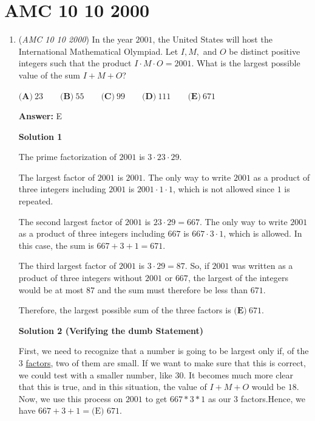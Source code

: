 \section{AMC 10 10 2000}
        \begin{enumerate}
        	\item (\textit{AMC 10 10 2000}) In the year $2001$, the United States will host the International Mathematical Olympiad. Let $I, M,$ and $O$ be distinct positive integers such that the product $I\cdot M \cdot O=2001$. What is the largest possible value of the sum $I+M+O$?


 $\textbf{(A)}\ 23 \qquad\textbf{(B)}\ 55 \qquad\textbf{(C)}\ 99 \qquad\textbf{(D)}\ 111 \qquad\textbf{(E)}\ 671$

 \textbf{Answer: }E



\textbf{Solution 1}

The prime factorization of $2001$ is $3 \cdot 23 \cdot 29$.  

 The largest factor of $2001$ is $2001$.  The only way to write $2001$ as a product of three integers including $2001$ is $2001 \cdot 1 \cdot 1$, which is not allowed since $1$ is repeated.

 The second largest factor of $2001$ is $23 \cdot 29 = 667$.  The only way to write $2001$ as a product of three integers including $667$ is $667 \cdot 3 \cdot 1$, which is allowed.  In this case, the sum is $667 + 3 + 1 = 671$.

 The third largest factor of $2001$ is $3 \cdot 29 = 87$.  So, if $2001$ was written as a product of three integers without $2001$ or $667$, the largest of the integers would be at most $87$ and the sum must therefore be less than $671$.

 Therefore, the largest possible sum of the three factors is $\boxed{\textbf{(E)}\ 671}$.

 



\textbf{Solution 2 (Verifying the dumb Statement)}

First, we need to recognize that a number is going to be largest only if, of the $3$ \href{https://artofproblemsolving.com/wiki/index.php?title=Factor}{factors}, two of them are small. If we want to make sure that this is correct, we could test with a smaller number, like $30$. It becomes much more clear that this is true, and in this situation, the value of $I + M + O$ would be $18$. Now, we use this process on $2001$ to get $667 * 3 * 1$ as our $3$ factors.Hence, we have $667 + 3 + 1 = \boxed{\text{(E) 671.}}$





\end{enumerate}

